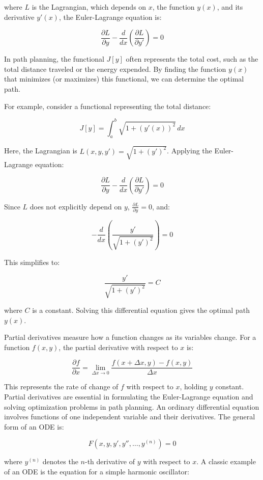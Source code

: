 \documentclass[12pt]{article}
\begin{document}
where \( L \) is the Lagrangian, which depends on \( x \), the function \( y(x) \), and its derivative \( y'(x) \), the Euler-Lagrange equation is:

\[
\frac{\partial L}{\partial y} - \frac{d}{dx} \left( \frac{\partial L}{\partial y'} \right) = 0
\]

In path planning, the functional \( J[y] \) often represents the total cost, such as the total distance traveled or the energy expended. By finding the function \( y(x) \) that minimizes (or maximizes) this functional, we can determine the optimal path.

For example, consider a functional representing the total distance:

\[
J[y] = \int_{a}^{b} \sqrt{1 + \left( y'(x) \right)^2} \, dx
\]

Here, the Lagrangian is \( L(x, y, y') = \sqrt{1 + (y')^2} \). Applying the Euler-Lagrange equation:

\[
\frac{\partial L}{\partial y} - \frac{d}{dx} \left( \frac{\partial L}{\partial y'} \right) = 0
\]

Since \( L \) does not explicitly depend on \( y \), \( \frac{\partial L}{\partial y} = 0 \), and:

\[
- \frac{d}{dx} \left( \frac{y'}{\sqrt{1 + (y')^2}} \right) = 0
\]

This simplifies to:

\[
\frac{y'}{\sqrt{1 + (y')^2}} = C
\]

where \( C \) is a constant. Solving this differential equation gives the optimal path \( y(x) \).

Partial derivatives measure how a function changes as its variables change. For a function \( f(x, y) \), the partial derivative with respect to \( x \) is:

\[
\frac{\partial f}{\partial x} = \lim_{\Delta x \to 0} \frac{f(x + \Delta x, y) - f(x, y)}{\Delta x}
\]

This represents the rate of change of \( f \) with respect to \( x \), holding \( y \) constant. Partial derivatives are essential in formulating the Euler-Lagrange equation and solving optimization problems in path planning. An ordinary differential equation involves functions of one independent variable and their derivatives. The general form of an ODE is:

\[
F(x, y, y', y'', \ldots, y^{(n)}) = 0
\]

where \( y^{(n)} \) denotes the \( n \)-th derivative of \( y \) with respect to \( x \).
A classic example of an ODE is the equation for a simple harmonic oscillator:
\end{document}
